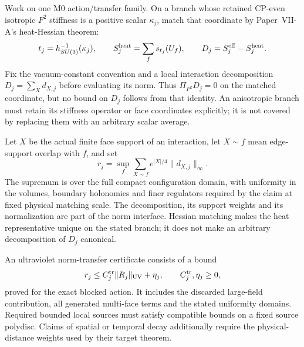\documentclass[12pt,a4paper]{article}
\begin{document}
\begin{definition}
\label{p12:def:v198-complete-action-norm-interface}
Work on one M0 action/transfer family.  On a branch whose retained CP-even
isotropic $F^2$ stiffness is a positive scalar $\kappa_j$, match that
coordinate by Paper~VII-A's heat-Hessian theorem:
\[
 t_j=h_{SU(3)}^{-1}(\kappa_j),\qquad
 S_j^{\rm heat}=\sum_f s_{t_j}(U_f),\qquad
 D_j=S_j^{\rm eff}-S_j^{\rm heat}.
\]
Fix the vacuum-constant convention and a local interaction decomposition
$D_j=\sum_Xd_{X,j}$ before evaluating its norm.  Thus
$\Pi_{F^2}D_j=0$ on the matched coordinate, but no bound on $D_j$ follows
from that identity.  An anisotropic branch must retain its stiffness
operator or face coordinates explicitly; it is not covered by replacing
them with an arbitrary scalar average.

Let $X$ be the actual finite face support of an interaction, let $X\sim f$
mean edge-support overlap with $f$, and set
\begin{equation}
\label{p12:eq:v198-crossover-defect-norm}
 r_j=\sup_f\sum_{X\sim f}e^{|X|/4}\|d_{X,j}\|_\infty.
\end{equation}
The supremum is over the full compact configuration domain, with uniformity
in the volumes, boundary holonomies and finer regulators required by the
claim at fixed physical matching scale.  The decomposition, its support
weights and its normalization are part of the norm interface.  Hessian
matching makes the heat representative unique on the stated branch; it
does not make an arbitrary decomposition of $D_j$ canonical.

An ultraviolet norm-transfer certificate consists of a bound
\begin{equation}
\label{p12:eq:v198-uv-ir-norm-transfer}
 r_j\le C_j^{\rm tr}\|R_j\|_{\rm UV}+\eta_j,
 \qquad C_j^{\rm tr},\eta_j\ge0,
\end{equation}
proved for the exact blocked action.  It includes the discarded large-field
contribution, all generated multi-face terms and the stated uniformity
domains.  Required bounded local sources must satisfy compatible bounds on
a fixed source polydisc.  Claims of spatial or temporal decay additionally
require the physical-distance weights used by their target theorem.
\end{definition}
\end{document}

